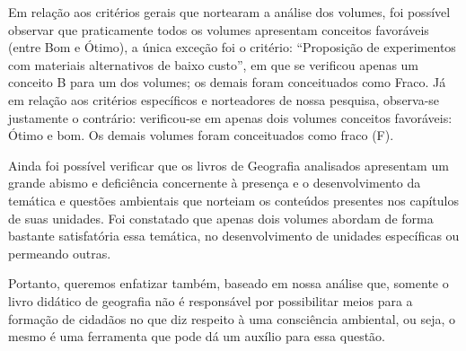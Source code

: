 \begin{refsection}
    Em relação aos critérios gerais que nortearam a análise dos volumes, foi possível observar que praticamente todos os volumes apresentam conceitos favoráveis (entre Bom e Ótimo), a única exceção foi o critério: “Proposição de experimentos com materiais alternativos de baixo custo”, em que se verificou apenas um conceito B para um dos volumes; os demais foram conceituados como Fraco. Já em relação aos critérios específicos e norteadores de nossa pesquisa, observa-se justamente o contrário: verificou-se em apenas dois volumes conceitos favoráveis: Ótimo e bom. Os demais volumes foram conceituados como fraco (F).  

    Ainda foi possível verificar que os livros de Geografia analisados apresentam um grande abismo e deficiência concernente à presença e o desenvolvimento da temática e questões ambientais que norteiam os conteúdos presentes nos capítulos de suas unidades. Foi constatado que apenas dois volumes abordam de forma bastante satisfatória essa temática, no desenvolvimento de unidades específicas ou permeando outras.  

    Portanto, queremos enfatizar também, baseado em nossa análise que, somente o livro didático de geografia não é responsável por possibilitar meios para a formação de cidadãos no que diz respeito à uma consciência ambiental, ou seja, o mesmo é uma ferramenta que pode dá um auxílio para essa questão.   

    \nocite{BEZERRA2003Temáticas}
    \nocite{LDB1996}
    \nocite{Fundeb2018}
    \nocite{LIMA2006Educação}
    \nocite{GUIALivroDidatico2017}


    \printbibliography[heading=subbibliography,notcategory=fullcited]

    \label{chap:educacao-ambiental-nosend}

\end{refsection}
